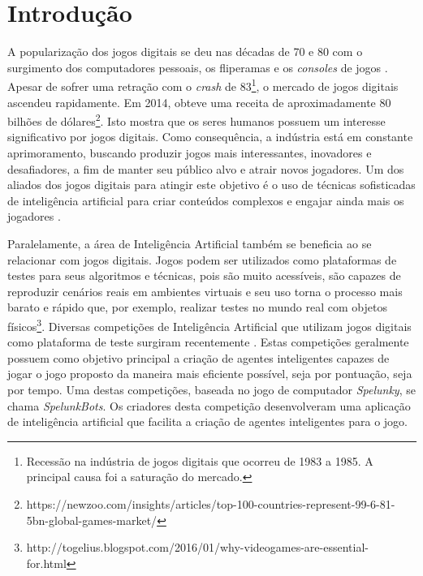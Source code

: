 \chapter{\label{chap:introduction}Introdução}


A popularização dos jogos digitais se deu nas décadas de 70 e 80 com o
surgimento dos computadores pessoais, os fliperamas e os \textit{consoles} de
jogos \cite{ultimate_history_video_games}. Apesar de sofrer uma retração com o
\textit{crash} de 83\footnote{Recessão na indústria de jogos digitais que
ocorreu de 1983 a 1985.  A principal causa foi a saturação do mercado.}, o
mercado de jogos digitais ascendeu rapidamente. Em 2014, obteve uma receita de
aproximadamente 80 bilhões de
dólares\footnote{https://newzoo.com/insights/articles/top-100-countries-represent-99-6-81-5bn-global-games-market/}.
Isto mostra que os seres humanos possuem um interesse significativo por jogos
digitais. Como consequência, a indústria está em constante aprimoramento,
buscando produzir jogos mais interessantes, inovadores e desafiadores, a fim de
manter seu público alvo e atrair novos jogadores. Um dos aliados dos jogos
digitais para atingir este objetivo é o uso de técnicas sofisticadas de
inteligência artificial para criar conteúdos complexos e engajar ainda mais os
jogadores \cite{PanoramaAIGames}.

Paralelamente, a área de Inteligência Artificial também se beneficia ao se
relacionar com jogos digitais. Jogos podem ser utilizados como plataformas de
testes para seus algoritmos e técnicas, pois são muito acessíveis, são capazes
de reproduzir cenários reais em ambientes virtuais e seu uso torna o processo
mais barato e rápido que, por exemplo, realizar testes no mundo real com objetos
físicos\footnote{http://togelius.blogspot.com/2016/01/why-videogames-are-essential-for.html}.
Diversas competições de Inteligência Artificial que utilizam jogos digitais como
plataforma de teste surgiram recentemente \cite{GameAiCompetition}.  Estas
competições geralmente possuem como objetivo principal a criação de agentes
inteligentes capazes de jogar o jogo proposto da maneira mais eficiente
possível, seja por pontuação, seja por tempo. Uma destas competições, baseada no
jogo de computador \textit{Spelunky}, se chama \textit{SpelunkBots}. Os
criadores desta competição desenvolveram uma aplicação de inteligência
artificial que facilita a criação de agentes inteligentes para o jogo.

